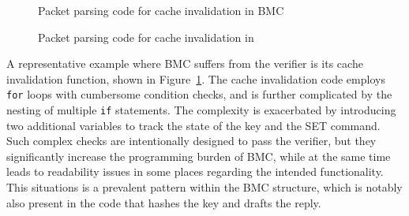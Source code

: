 \begin{figure}
    
    \caption{Packet parsing code for cache invalidation in BMC}
    \label{fig:bmc-code}
\end{figure}
\begin{figure}
    
    \caption{Packet parsing code for cache invalidation in \projname{}
    }
    \label{fig:rust-code}
\end{figure}

A representative example where BMC suffers from the verifier is its cache
    invalidation function, shown in Figure~\ref{fig:bmc-code}.
The cache invalidation code employs \texttt{for} loops with cumbersome
    condition checks, and is further complicated by the nesting of multiple
    \texttt{if} statements.
The complexity is exacerbated by introducing two additional variables to track
    the state of the key and the SET command.
Such complex checks are intentionally designed to pass the
    verifier, but they significantly increase the programming burden
    of BMC, while at the same time leads to readability issues in some places
    regarding the intended functionality.
This situations is a prevalent pattern within the BMC structure, which is
    notably also present in the code that hashes the key and drafts the reply.



